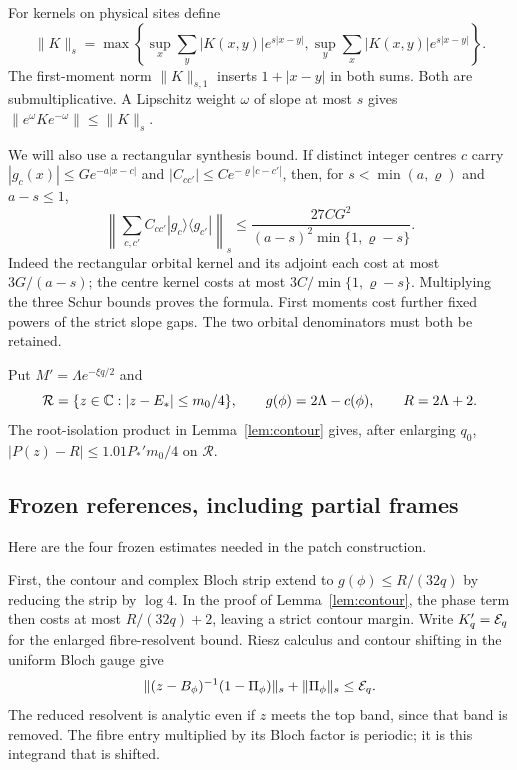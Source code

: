 For kernels on physical sites define
\[
 \|K\|_s=\max\left\{\sup_x\sum_y|K(x,y)|e^{s|x-y|},
                       \sup_y\sum_x|K(x,y)|e^{s|x-y|}\right\}.
\]
The first-moment norm $\|K\|_{s,1}$ inserts $1+|x-y|$ in both sums. Both are submultiplicative. A Lipschitz weight $\omega$ of slope at most $s$ gives
$\|e^\omega K e^{-\omega}\|\le\|K\|_s$.

We will also use a rectangular synthesis bound. If distinct integer centres $c$ carry $|g_c(x)|\le G e^{-a|x-c|}$ and
$|C_{cc'}|\le C e^{-\varrho|c-c'|}$, then, for $s<\min(a,\varrho)$ and $a-s\le1$,
\begin{equation}\label{eq:belowsynthesis}
 \left\|\sum_{c,c'}C_{cc'}|g_c\rangle\langle g_{c'}|\right\|_s
 \le\frac{27CG^2}{(a-s)^2\min\{1,\varrho-s\}}.
\end{equation}
Indeed the rectangular orbital kernel and its adjoint each cost at most $3G/(a-s)$; the centre kernel costs at most $3C/\min\{1,\varrho-s\}$. Multiplying the three Schur bounds proves the formula. First moments cost further fixed powers of the strict slope gaps. The two orbital denominators must both be retained.

Put $M'=\Lambda e^{-\xi q/2}$ and
\[
 \mathcal R=\{z\in\mathbb C:|z-E_*|\le m_0/4\},\qquad
 g(\phi)=2\Lambda-c(\phi),\qquad R=2\Lambda+2.
\]
The root-isolation product in Lemma~\ref{lem:contour} gives, after enlarging $q_0$,
$|P(z)-R|\le 1.01P_*'m_0/4$ on $\mathcal R$.

\subsection{Frozen references, including partial frames}
Here are the four frozen estimates needed in the patch construction.

First, the contour and complex Bloch strip extend to $g(\phi)\le R/(32q)$ by reducing the strip by $\log4$. In the proof of Lemma~\ref{lem:contour}, the phase term then costs at most $R/(32q)+2$, leaving a strict contour margin. Write $K_q'=\mathcal E_q$ for the enlarged fibre-resolvent bound. Riesz calculus and contour shifting in the uniform Bloch gauge give
\begin{equation}\label{eq:belowF1}
 \|(z-B_\phi)^{-1}(1-\Pi_\phi)\|_s+\|\Pi_\phi\|_s\le\mathcal E_q.
\end{equation}
The reduced resolvent is analytic even if $z$ meets the top band, since that band is removed. The fibre entry multiplied by its Bloch factor is periodic; it is this integrand that is shifted.

